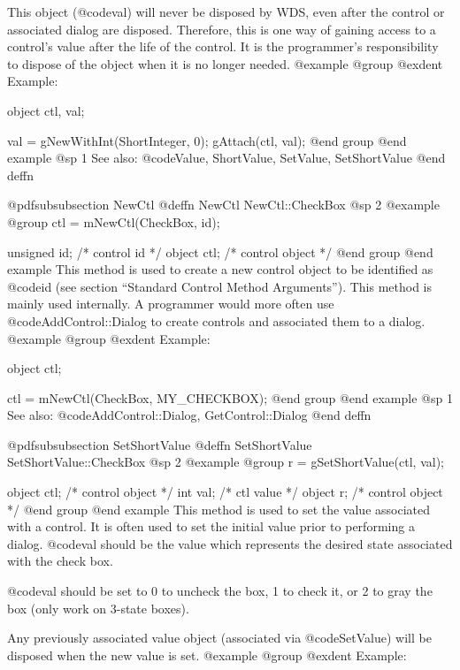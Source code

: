This object (@code{val}) will never be disposed by WDS, even after
the control or associated dialog are disposed.  Therefore, this
is one way of gaining access to a control's value after the life
of the control.  It is the programmer's responsibility to dispose of
the object when it is no longer needed.
@example
@group
@exdent Example:

object  ctl, val;

val = gNewWithInt(ShortInteger, 0);
gAttach(ctl, val);
@end group
@end example
@sp 1
See also:  @code{Value, ShortValue, SetValue, SetShortValue}
@end deffn












@pdfsubsubsection {NewCtl}
@deffn {NewCtl} NewCtl::CheckBox
@sp 2
@example
@group
ctl = mNewCtl(CheckBox, id);

unsigned  id;   /*  control id      */
object   ctl;   /*  control object  */
@end group
@end example
This method is used to create a new control object to be identified as
@code{id} (see section ``Standard Control Method Arguments'').  This
method is mainly used internally.  A programmer would more often
use @code{AddControl::Dialog} to create controls and associated them
to a dialog.
@example
@group
@exdent Example:

object  ctl;

ctl = mNewCtl(CheckBox, MY_CHECKBOX);
@end group
@end example
@sp 1
See also:  @code{AddControl::Dialog, GetControl::Dialog}
@end deffn







@pdfsubsubsection {SetShortValue}
@deffn {SetShortValue} SetShortValue::CheckBox
@sp 2
@example
@group
r = gSetShortValue(ctl, val);

object  ctl;    /*  control object  */
int     val;    /*  ctl value       */
object  r;      /*  control object  */
@end group
@end example
This method is used to set the value associated with a control.  It is
often used to set the initial value prior to performing a dialog.
@code{val} should be the value which represents the desired state associated
with the check box.

@code{val} should be set to 0 to uncheck the box, 1 to check it, or 2 to
gray the box (only work on 3-state boxes).

Any previously associated value object (associated via @code{SetValue})
will be disposed when the new value is set.
@example
@group
@exdent Example:

